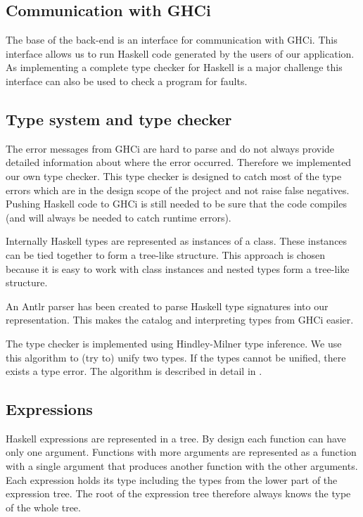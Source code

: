 \subsection{Communication with GHCi}
\label{GHCi}

The base of the back-end is an interface for communication with GHCi. This interface allows us to run Haskell code
generated by the users of our application. As implementing a complete type checker for Haskell is a major challenge this
interface can also be used to check a program for faults.

\subsection{Type system and type checker}

The error messages from GHCi are hard to parse and do not always provide detailed information about where the error
occurred. Therefore we implemented our own type checker. This type checker is designed to catch most of the type errors 
which are in the design scope of the project and not raise false negatives. Pushing Haskell code to GHCi is still needed
to be sure that the code compiles (and will always be needed to catch runtime errors).

Internally Haskell types are represented as instances of a class. These instances can be tied together to form a
tree-like structure. This approach is chosen because it is easy to work with class instances and nested types form
a tree-like structure. 

An Antlr parser has been created to parse Haskell type signatures into our representation. This makes the catalog and interpreting types from GHCi easier.

The type checker is implemented using Hindley-Milner type inference. We use this algorithm to (try to) unify two
types. If the types cannot be unified, there exists a type error. The algorithm is described in detail in
\cite{borisov}.  

\subsection{Expressions}

Haskell expressions are represented in a tree.
By design each function can have only one argument.
Functions with more arguments are represented as a function with a single argument that produces another function with the other arguments.
Each expression holds its type including the types from the lower part of the expression tree. The root of the
expression tree therefore always knows the type of the whole tree.

